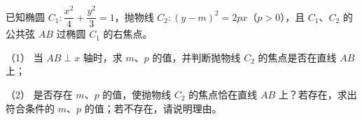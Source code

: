 \begin{question}
已知椭圆 $C_1:\dfrac{x^2}{4}+\dfrac{y^2}{3}=1$，抛物线 $C_2:(y-m)^2=2px$（$p>0$），且 $C_1$、$C_2$ 的公共弦 $AB$ 过椭圆 $C_1$ 的右焦点。

（1） 当 $AB\perp x$ 轴时，求 $m$、$p$ 的值，并判断抛物线 $C_2$ 的焦点是否在直线 $AB$ 上；

（2） 是否存在 $m$、$p$ 的值，使抛物线 $C_2$ 的焦点恰在直线 $AB$ 上？若存在，求出符合条件的 $m$、$p$ 的值；若不存在，请说明理由。

\end{question}